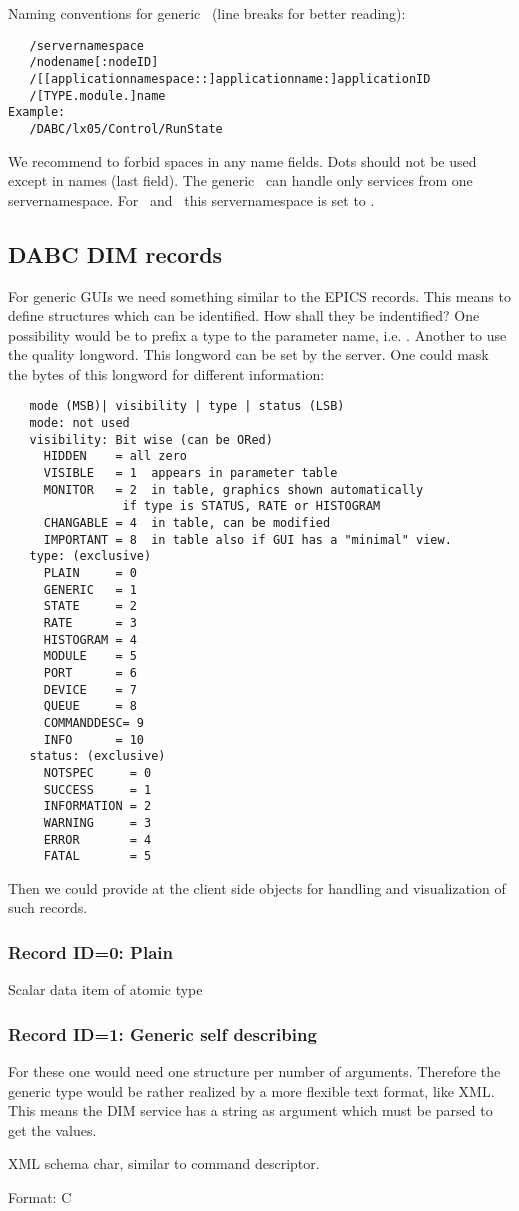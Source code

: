 Naming conventions for generic \gui\ (line breaks for better reading):
{\small \begin{verbatim}
   /servernamespace
   /nodename[:nodeID]
   /[[applicationnamespace::]applicationname:]applicationID
   /[TYPE.module.]name
Example:
   /DABC/lx05/Control/RunState
\end{verbatim}
}
We recommend to forbid spaces in any name fields. Dots should not be used except in names (last field). The generic \gui\ can handle only services from one servernamespace. For \dabc\ and \mbs\ this servernamespace is set to .
\subsection{DABC DIM records}
For generic GUIs we need something similar to the EPICS records. This means to define structures which can be identified. How shall they be indentified? One possibility would be to prefix a type to the parameter name, i.e. . Another to use the quality longword. This longword can be set by the server. One could mask the bytes of this longword for different information:
{\small \begin{verbatim}
   mode (MSB)| visibility | type | status (LSB)
   mode: not used
   visibility: Bit wise (can be ORed)
     HIDDEN    = all zero
     VISIBLE   = 1  appears in parameter table
     MONITOR   = 2  in table, graphics shown automatically 
     			if type is STATUS, RATE or HISTOGRAM
     CHANGABLE = 4  in table, can be modified
     IMPORTANT = 8  in table also if GUI has a "minimal" view.
   type: (exclusive)
     PLAIN     = 0
     GENERIC   = 1
     STATE     = 2
     RATE      = 3
     HISTOGRAM = 4
     MODULE    = 5
     PORT      = 6
     DEVICE    = 7
     QUEUE     = 8
     COMMANDDESC= 9
     INFO      = 10
   status: (exclusive) 
     NOTSPEC     = 0
     SUCCESS     = 1
     INFORMATION = 2
     WARNING     = 3
     ERROR       = 4
     FATAL       = 5
\end{verbatim}
}

Then we could provide at the client side objects for handling and visualization of such records.

\subsubsection{Record ID=0: Plain}

Scalar data item of atomic type

\subsubsection{Record ID=1: Generic self describing}
For these one would need one structure per number of arguments. Therefore the generic type would be rather realized by a more flexible text format, like XML. This means the DIM service has a string as argument which must be parsed to get the values.
\begin{compactdesc}
\item[XML schema] char, similar to command descriptor.
\item[Format:] C
\end{compactdesc}

